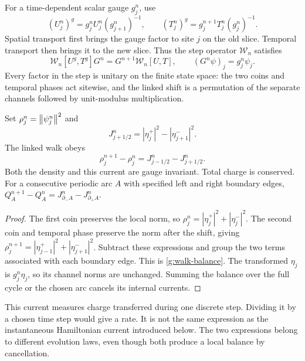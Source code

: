 For a time-dependent scalar gauge $g_j^n$, use
\begin{equation}\label{g:temporal-link}
 (U_j^n)^g=g_j^nU_j^n(g_{j+1}^n)^{-1},
 \qquad (T_j^n)^g=g_j^{n+1}T_j^n(g_j^n)^{-1}.
\end{equation}
Spatial transport first brings the gauge factor to site $j$ on the old slice. Temporal transport then brings it to the new slice. Thus the step operator $\mathcal W_n$ satisfies
\begin{equation}\label{g:walk-covariance}
 \mathcal W_n[U^g,T^g]G^n=G^{n+1}\mathcal W_n[U,T],
 \qquad (G^n\psi)_j=g_j^n\psi_j.
\end{equation}
Every factor in the step is unitary on the finite state space: the two coins and temporal phases act sitewise, and the linked shift is a permutation of the separate channels followed by unit-modulus multiplication.

\begin{proposition}\label{g:walk-continuity}
Set $\rho_j^n=\left\lVert\psi_j^n\right\rVert^2$ and
\begin{equation}\label{g:walk-current}
 J_{j+1/2}^n=|\eta_j^+|^2-|\eta_{j+1}^-|^2.
\end{equation}
The linked walk obeys
\begin{equation}\label{g:walk-balance}
 \rho_j^{n+1}-\rho_j^n=J_{j-1/2}^n-J_{j+1/2}^n.
\end{equation}
Both the density and this current are gauge invariant. Total charge is conserved. For a consecutive periodic arc $A$ with specified left and right boundary edges,
$Q_A^{n+1}-Q_A^n=J_{\partial_-A}^n-J_{\partial_+A}^n$.
\end{proposition}

\begin{proof}
The first coin preserves the local norm, so
$\rho_j^n=|\eta_j^+|^2+|\eta_j^-|^2$. The second coin and temporal phase preserve the norm after the shift, giving
$\rho_j^{n+1}=|\eta_{j-1}^+|^2+|\eta_{j+1}^-|^2$.
Subtract these expressions and group the two terms associated with each boundary edge. This is \eqref{g:walk-balance}. The transformed $\eta_j$ is $g_j^n\eta_j$, so its channel norms are unchanged. Summing the balance over the full cycle or the chosen arc cancels its internal currents.
\end{proof}

This current measures charge transferred during one discrete step. Dividing it by a chosen time step would give a rate. It is not the same expression as the instantaneous Hamiltonian current introduced below. The two expressions belong to different evolution laws, even though both produce a local balance by cancellation.

